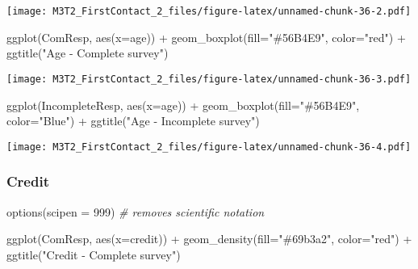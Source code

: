 \documentclass[
]{article}
\newenvironment{Shaded}{\begin{snugshade}}{\end{snugshade}}
\newcommand{\AttributeTok}[1]{\textcolor[rgb]{0.77,0.63,0.00}{#1}}
\newcommand{\CommentTok}[1]{\textcolor[rgb]{0.56,0.35,0.01}{\textit{#1}}}
\newcommand{\DecValTok}[1]{\textcolor[rgb]{0.00,0.00,0.81}{#1}}
\newcommand{\FunctionTok}[1]{\textcolor[rgb]{0.00,0.00,0.00}{#1}}
\newcommand{\NormalTok}[1]{#1}
\newcommand{\SpecialCharTok}[1]{\textcolor[rgb]{0.00,0.00,0.00}{#1}}
\newcommand{\StringTok}[1]{\textcolor[rgb]{0.31,0.60,0.02}{#1}}
\begin{document}
\texttt{[image: M3T2\_FirstContact\_2\_files/figure-latex/unnamed-chunk-36-2.pdf]}

\begin{Shaded}
\begin{Highlighting}[]
\FunctionTok{ggplot}\NormalTok{(ComResp, }\FunctionTok{aes}\NormalTok{(}\AttributeTok{x=}\NormalTok{age)) }\SpecialCharTok{+} \FunctionTok{geom\_boxplot}\NormalTok{(}\AttributeTok{fill=}\StringTok{"\#56B4E9"}\NormalTok{, }\AttributeTok{color=}\StringTok{"red"}\NormalTok{) }\SpecialCharTok{+} \FunctionTok{ggtitle}\NormalTok{(}\StringTok{"Age {-} Complete survey"}\NormalTok{)}
\end{Highlighting}
\end{Shaded}

\texttt{[image: M3T2\_FirstContact\_2\_files/figure-latex/unnamed-chunk-36-3.pdf]}

\begin{Shaded}
\begin{Highlighting}[]
\FunctionTok{ggplot}\NormalTok{(IncompleteResp, }\FunctionTok{aes}\NormalTok{(}\AttributeTok{x=}\NormalTok{age)) }\SpecialCharTok{+} \FunctionTok{geom\_boxplot}\NormalTok{(}\AttributeTok{fill=}\StringTok{"\#56B4E9"}\NormalTok{, }\AttributeTok{color=}\StringTok{"Blue"}\NormalTok{)  }\SpecialCharTok{+} \FunctionTok{ggtitle}\NormalTok{(}\StringTok{"Age {-} Incomplete survey"}\NormalTok{)}
\end{Highlighting}
\end{Shaded}

\texttt{[image: M3T2\_FirstContact\_2\_files/figure-latex/unnamed-chunk-36-4.pdf]}

\hypertarget{credit-1}{%
\subsubsection{Credit}\label{credit-1}}

\begin{Shaded}
\begin{Highlighting}[]
\FunctionTok{options}\NormalTok{(}\AttributeTok{scipen =} \DecValTok{999}\NormalTok{) }\CommentTok{\# removes scientific notation}

\FunctionTok{ggplot}\NormalTok{(ComResp, }\FunctionTok{aes}\NormalTok{(}\AttributeTok{x=}\NormalTok{credit)) }\SpecialCharTok{+}
    \FunctionTok{geom\_density}\NormalTok{(}\AttributeTok{fill=}\StringTok{"\#69b3a2"}\NormalTok{, }\AttributeTok{color=}\StringTok{"red"}\NormalTok{) }\SpecialCharTok{+} 
    \FunctionTok{ggtitle}\NormalTok{(}\StringTok{"Credit {-} Complete survey"}\NormalTok{)}
\end{Highlighting}
\end{Shaded}
\end{document}
